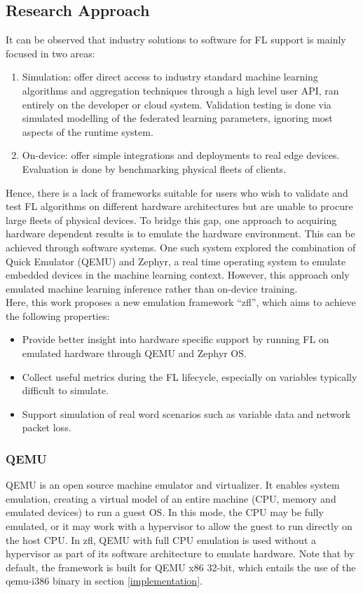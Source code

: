 \documentclass[12pt]{article}
\begin{document}
\subsection{Research Approach}
It can be observed that industry solutions to software for FL support is mainly focused in two
areas:
\begin{enumerate}
  \item Simulation: offer direct access to industry standard machine learning algorithms and aggregation
    techniques through a high level user API, ran entirely on the developer or cloud system. Validation testing is done via simulated
    modelling of the federated learning parameters, ignoring most aspects of the runtime system.
  \item On-device: offer simple integrations and deployments to real edge devices. Evaluation is
    done by benchmarking physical fleets of clients.
\end{enumerate}
Hence, there is a lack of frameworks suitable for users who wish to validate and test FL algorithms on different hardware
architectures but are unable to procure large fleets of physical devices. To bridge this gap,
one approach to acquiring hardware dependent results is to emulate the hardware environment. This
can be achieved through software systems. One such system explored the combination of Quick Emulator (QEMU)
and Zephyr, a real time operating system to emulate embedded devices in the machine learning context\cite{ntu}. However,
this approach only emulated machine learning inference rather than on-device training.\\

Here, this work proposes a new emulation framework ``zfl'', which aims to achieve the following
properties:
\begin{itemize}
  \item Provide better insight into hardware specific support by running FL on emulated hardware
    through QEMU and Zephyr OS.
  \item Collect useful metrics during the FL lifecycle, especially on variables typically difficult
    to simulate.
  \item Support simulation of real word scenarios such as variable data and network packet loss.
\end{itemize}

\subsubsection{QEMU}
QEMU\cite{qemu} is an open source machine emulator and virtualizer. It enables system emulation,
creating a virtual model of an entire machine (CPU, memory and emulated devices) to run a guest OS.
In this mode, the CPU may be fully emulated, or it may work with a hypervisor to allow the guest to
run directly on the host CPU. In zfl, QEMU with full CPU emulation is used without a hypervisor as
part of its software architecture to emulate hardware. Note that by default, the framework
is built for QEMU x86 32-bit, which entails the use of the qemu-i386 binary in section \ref{implementation}.
\end{document}
